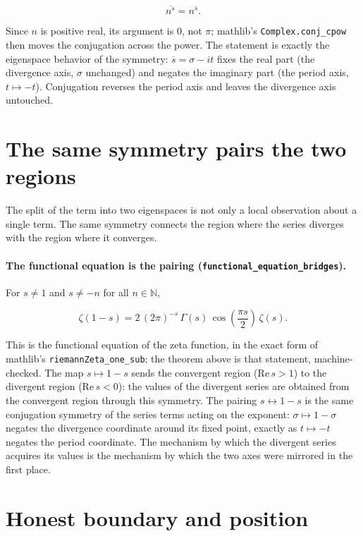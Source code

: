 \documentclass[sigplan,10pt,anonymous,review]{acmart}
\begin{document}
\begin{equation*}
  \overline{n^s} = n^{\overline{s}} .
\end{equation*}

Since $n$ is positive real, its argument is $0$, not $\pi$; mathlib's
\texttt{Complex.conj\_cpow} then moves the conjugation across the
power. The statement is exactly the eigenspace behavior of the
symmetry: $\overline{s} = \sigma - it$ fixes the real part (the
divergence axis, $\sigma$ unchanged) and negates the imaginary part
(the period axis, $t \mapsto -t$). Conjugation reverses the period
axis and leaves the divergence axis untouched.

\section{The same symmetry pairs the two regions}

The split of the term into two eigenspaces is not only a local
observation about a single term. The same symmetry connects the region
where the series diverges with the region where it converges.

\paragraph{The functional equation is the pairing
(\texttt{functional\_equation\_bridges}).} For $s \neq 1$ and
$s \neq -n$ for all $n \in \mathbb{N}$,

\begin{equation*}
  \zeta(1-s) = 2\,(2\pi)^{-s}\,\Gamma(s)\,
  \cos\!\left(\frac{\pi s}{2}\right)\, \zeta(s) .
\end{equation*}

This is the functional equation of the zeta function, in the exact
form of mathlib's \texttt{riemannZeta\_one\_sub}; the theorem above is
that statement, machine-checked. The map $s \mapsto 1-s$ sends the
convergent region ($\mathrm{Re}\,s > 1$) to the divergent region
($\mathrm{Re}\,s < 0$): the values of the divergent series are obtained
from the convergent region through this symmetry. The pairing $s
\leftrightarrow 1-s$ is the same conjugation symmetry of the series
terms acting on the exponent: $\sigma \mapsto 1-\sigma$ negates the
divergence coordinate around its fixed point, exactly as
$t \mapsto -t$ negates the period coordinate. The mechanism by which
the divergent series acquires its values is the mechanism by which the
two axes were mirrored in the first place.

\section{Honest boundary and position}
\end{document}
